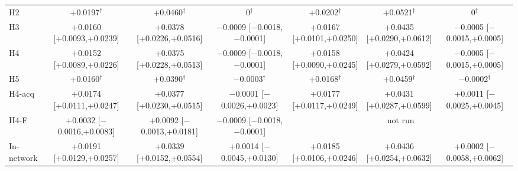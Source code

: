 \documentclass[conference]{IEEEtran}
\begin{document}
\begin{table}[htbp]
\begin{center}
\begin{tabular}{|l|c|c|c|c|c|c|}
H2 & +0.0197$^\dagger$ & +0.0460$^\dagger$ & 0$^\dagger$ & +0.0202$^\dagger$ & +0.0521$^\dagger$ & 0$^\dagger$ \\
H3 & \shortstack{+0.0160\\{[+0.0093,+0.0239]}} & \shortstack{+0.0378\\{[+0.0226,+0.0516]}} & \shortstack{$-$0.0009\\{[$-$0.0018,$-$0.0001]}} & \shortstack{+0.0167\\{[+0.0101,+0.0250]}} & \shortstack{+0.0435\\{[+0.0290,+0.0612]}} & \shortstack{$-$0.0005\\{[$-$0.0015,+0.0005]}} \\
H4 & \shortstack{+0.0152\\{[+0.0089,+0.0226]}} & \shortstack{+0.0375\\{[+0.0228,+0.0513]}} & \shortstack{$-$0.0009\\{[$-$0.0018,$-$0.0001]}} & \shortstack{+0.0158\\{[+0.0090,+0.0245]}} & \shortstack{+0.0424\\{[+0.0279,+0.0592]}} & \shortstack{$-$0.0005\\{[$-$0.0015,+0.0005]}} \\
H5 & +0.0160$^\dagger$ & +0.0390$^\dagger$ & $-$0.0003$^\dagger$ & +0.0168$^\dagger$ & +0.0459$^\dagger$ & $-$0.0002$^\dagger$ \\
H4-acq & \shortstack{+0.0174\\{[+0.0111,+0.0247]}} & \shortstack{+0.0377\\{[+0.0230,+0.0515]}} & \shortstack{$-$0.0001\\{[$-$0.0026,+0.0023]}} & \shortstack{+0.0177\\{[+0.0117,+0.0249]}} & \shortstack{+0.0431\\{[+0.0287,+0.0599]}} & \shortstack{+0.0011\\{[$-$0.0025,+0.0045]}} \\
H4-F & \shortstack{+0.0032\\{[$-$0.0016,+0.0083]}} & \shortstack{+0.0092\\{[$-$0.0013,+0.0181]}} & \shortstack{$-$0.0009\\{[$-$0.0018,$-$0.0001]}} & \multicolumn{3}{c|}{not run} \\
In-network & \shortstack{+0.0191\\{[+0.0129,+0.0257]}} & \shortstack{+0.0339\\{[+0.0152,+0.0554]}} & \shortstack{+0.0014\\{[$-$0.0045,+0.0130]}} & \shortstack{+0.0185\\{[+0.0106,+0.0246]}} & \shortstack{+0.0436\\{[+0.0254,+0.0632]}} & \shortstack{+0.0002\\{[$-$0.0058,+0.0062]}} \\

\end{tabular}
\end{center}
\end{table}
\end{document}
